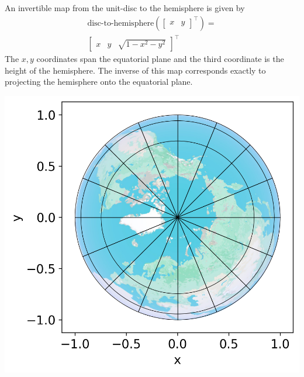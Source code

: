 {    An invertible map from the unit-disc to the hemisphere is given by 
    \begin{align*}
        \text{disc-to-hemisphere}(\begin{bmatrix}x & y\end{bmatrix}^\top) = \\\begin{bmatrix}x & y & \sqrt{1 - x^2 - y^2}\end{bmatrix}^\top 
    \end{align*}
    The $x, y$ coordinates span the equatorial plane and the third coordinate is the height of the hemisphere. The inverse of this map corresponds exactly to projecting the hemisphere onto the equatorial plane.
    \begin{center}
        \hspace*{-0.06\columnwidth}\includegraphics[width=0.7\columnwidth]{../images/hemisphere_circle_of_latitude.png}
    \end{center}
}
    
    
    

